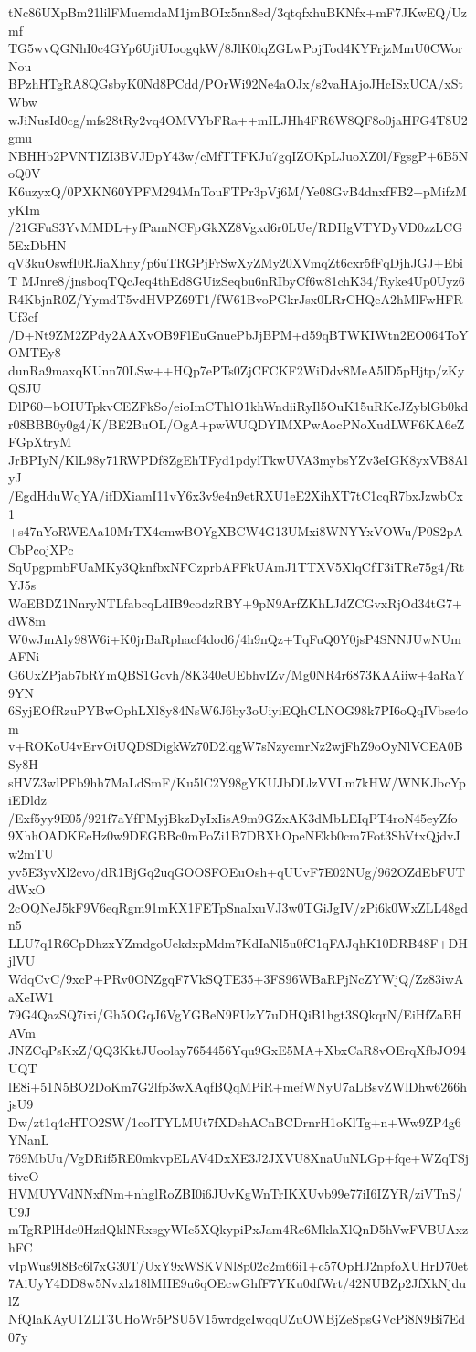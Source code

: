 tNc86UXpBm21lilFMuemdaM1jmBOIx5nn8ed/3qtqfxhuBKNfx+mF7JKwEQ/Uzmf
TG5wvQGNhI0c4GYp6UjiUIoogqkW/8JlK0lqZGLwPojTod4KYFrjzMmU0CWorNou
BPzhHTgRA8QGsbyK0Nd8PCdd/POrWi92Ne4aOJx/s2vaHAjoJHcISxUCA/xStWbw
wJiNusId0cg/mfs28tRy2vq4OMVYbFRa++mILJHh4FR6W8QF8o0jaHFG4T8U2gmu
NBHHb2PVNTIZI3BVJDpY43w/cMfTTFKJu7gqIZOKpLJuoXZ0l/FgsgP+6B5NoQ0V
K6uzyxQ/0PXKN60YPFM294MnTouFTPr3pVj6M/Ye08GvB4dnxfFB2+pMifzMyKIm
/21GFuS3YvMMDL+yfPamNCFpGkXZ8Vgxd6r0LUe/RDHgVTYDyVD0zzLCG5ExDbHN
qV3kuOswfI0RJiaXhny/p6uTRGPjFrSwXyZMy20XVmqZt6cxr5fFqDjhJGJ+EbiT
MJnre8/jnsboqTQcJeq4thEd8GUizSeqbu6nRIbyCf6w81chK34/Ryke4Up0Uyz6
R4KbjnR0Z/YymdT5vdHVPZ69T1/fW61BvoPGkrJsx0LRrCHQeA2hMlFwHFRUf3cf
/D+Nt9ZM2ZPdy2AAXvOB9FlEuGnuePbJjBPM+d59qBTWKIWtn2EO064ToYOMTEy8
dunRa9maxqKUnn70LSw++HQp7ePTs0ZjCFCKF2WiDdv8MeA5lD5pHjtp/zKyQSJU
DlP60+bOIUTpkvCEZFkSo/eioImCThlO1khWndiiRyIl5OuK15uRKeJZyblGb0kd
r08BBB0y0g4/K/BE2BuOL/OgA+pwWUQDYIMXPwAocPNoXudLWF6KA6eZFGpXtryM
JrBPIyN/KlL98y71RWPDf8ZgEhTFyd1pdylTkwUVA3mybsYZv3eIGK8yxVB8AlyJ
/EgdHduWqYA/ifDXiamI11vY6x3v9e4n9etRXU1eE2XihXT7tC1cqR7bxJzwbCx1
+s47nYoRWEAa10MrTX4emwBOYgXBCW4G13UMxi8WNYYxVOWu/P0S2pACbPcojXPc
SqUpgpmbFUaMKy3QknfbxNFCzprbAFFkUAmJ1TTXV5XlqCfT3iTRe75g4/RtYJ5s
WoEBDZ1NnryNTLfabcqLdIB9codzRBY+9pN9ArfZKhLJdZCGvxRjOd34tG7+dW8m
W0wJmAly98W6i+K0jrBaRphacf4dod6/4h9nQz+TqFuQ0Y0jsP4SNNJUwNUmAFNi
G6UxZPjab7bRYmQBS1Gcvh/8K340eUEbhvIZv/Mg0NR4r6873KAAiiw+4aRaY9YN
6SyjEOfRzuPYBwOphLXl8y84NsW6J6by3oUiyiEQhCLNOG98k7PI6oQqIVbse4om
v+ROKoU4vErvOiUQDSDigkWz70D2lqgW7sNzycmrNz2wjFhZ9oOyNlVCEA0BSy8H
sHVZ3wlPFb9hh7MaLdSmF/Ku5lC2Y98gYKUJbDLlzVVLm7kHW/WNKJbcYpiEDldz
/Exf5yy9E05/921f7aYfFMyjBkzDyIxIisA9m9GZxAK3dMbLEIqPT4roN45eyZfo
9XhhOADKEeHz0w9DEGBBc0mPoZi1B7DBXhOpeNEkb0cm7Fot3ShVtxQjdvJw2mTU
yv5E3yvXl2cvo/dR1BjGq2uqGOOSFOEuOsh+qUUvF7E02NUg/962OZdEbFUTdWxO
2cOQNeJ5kF9V6eqRgm91mKX1FETpSnaIxuVJ3w0TGiJgIV/zPi6k0WxZLL48gdn5
LLU7q1R6CpDhzxYZmdgoUekdxpMdm7KdIaNl5u0fC1qFAJqhK10DRB48F+DHjlVU
WdqCvC/9xcP+PRv0ONZgqF7VkSQTE35+3FS96WBaRPjNcZYWjQ/Zz83iwAaXeIW1
79G4QazSQ7ixi/Gh5OGqJ6VgYGBeN9FUzY7uDHQiB1hgt3SQkqrN/EiHfZaBHAVm
JNZCqPsKxZ/QQ3KktJUoolay7654456Yqu9GxE5MA+XbxCaR8vOErqXfbJO94UQT
lE8i+51N5BO2DoKm7G2lfp3wXAqfBQqMPiR+mefWNyU7aLBsvZWlDhw6266hjsU9
Dw/zt1q4cHTO2SW/1coITYLMUt7fXDshACnBCDrnrH1oKlTg+n+Ww9ZP4g6YNanL
769MbUu/VgDRif5RE0mkvpELAV4DxXE3J2JXVU8XnaUuNLGp+fqe+WZqTSjtiveO
HVMUYVdNNxfNm+nhglRoZBI0i6JUvKgWnTrIKXUvb99e77iI6IZYR/ziVTnS/U9J
mTgRPlHdc0HzdQklNRxsgyWIc5XQkypiPxJam4Rc6MklaXlQnD5hVwFVBUAxzhFC
vIpWus9I8Bc6l7xG30T/UxY9xWSKVNl8p02c2m66i1+c57OpHJ2npfoXUHrD70et
7AiUyY4DD8w5Nvxlz18lMHE9u6qOEcwGhfF7YKu0dfWrt/42NUBZp2JfXkNjdulZ
NfQIaKAyU1ZLT3UHoWr5PSU5V15wrdgcIwqqUZuOWBjZeSpsGVcPi8N9Bi7Ed07y
